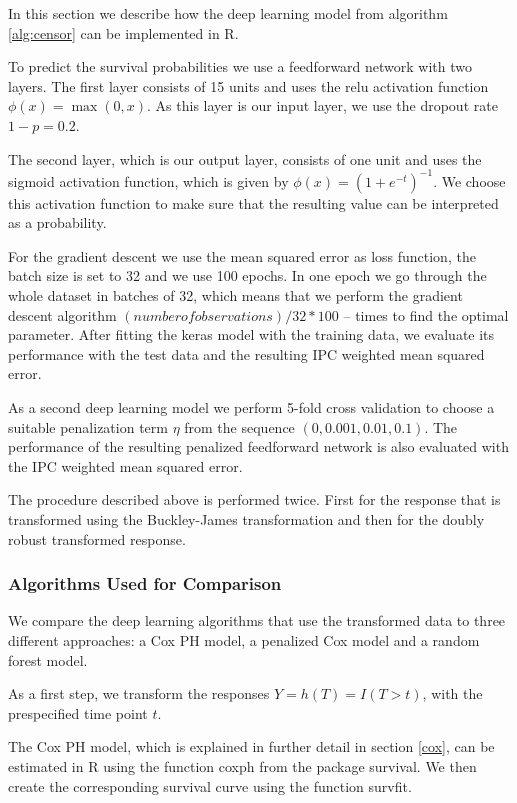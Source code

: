 \documentclass[12pt, a4paper]{article}
\theoremstyle{definition}
\theoremstyle{plain}
\numberwithin{equation}{section}
\numberwithin{figure}{section}
\numberwithin{table}{section}
\begin{document}
	In this section we describe how the deep learning model from algorithm \ref{alg:censor} can be implemented in R.
	
	To predict the survival probabilities we use a feedforward network with two layers.
	The first layer consists of 15 units and uses the relu activation function $\phi(x) = \max(0, x)$.
	As this layer is our input layer, we use the dropout rate $1-p=0.2$.
	
	The second layer, which is our output layer, consists of one unit and uses the sigmoid activation function, which is given by $\phi(x)=(1+e^{-t})^{-1}$.
	We choose this activation function to make sure that the resulting value can be interpreted as a probability.
	
	For the gradient descent we use the mean squared error as loss function, the batch size is set to 32 and we use 100 epochs.
	In one epoch we go through the whole dataset in batches of 32, which means that we perform the gradient descent algorithm $(number of observations)/32*100$ -- times to find the optimal parameter.
	After fitting the keras model with the training data, we evaluate its performance with the test data and the resulting IPC weighted mean squared error.
	
	As a second deep learning model we perform 5-fold cross validation to choose a suitable penalization term $\eta$ from the sequence $(0, 0.001, 0.01, 0.1)$.
	The performance of the resulting penalized feedforward network is also evaluated with the IPC weighted mean squared error.
	
	The procedure described above is performed twice.
	First for the response that is transformed using the Buckley-James transformation and then for the doubly robust transformed response.
	\subsubsection{Algorithms Used for Comparison}
	
	We compare the deep learning algorithms that use the transformed data to three different approaches: a Cox PH model, a penalized Cox model and a random forest model.
	
	As a first step, we transform the responses $Y=h(T)=I(T>t)$, with the prespecified time point $t$.
	
	The Cox PH model, which is explained in further detail in section \ref{cox}, can be estimated in R using the function coxph from the package survival.
	We then create the corresponding survival curve using the function survfit.
	
\end{document}
